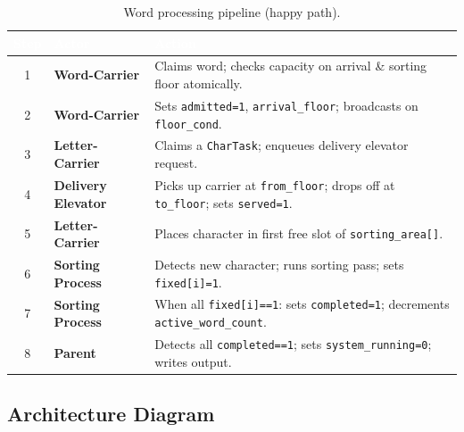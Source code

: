 \documentclass[12pt,a4paper]{article}
\newcommand{\code}[1]{\texttt{\small #1}}
\begin{document}
\begin{table}[h!]
\centering
\caption{Word processing pipeline (happy path).}
\begin{tabularx}{\textwidth}{c >{\bfseries}l X}
\toprule
\rowcolor{darkblue}
\textcolor{white}{Step} &
\textcolor{white}{Actor} &
\textcolor{white}{Action} \\
\midrule
1 & Word-Carrier & Claims word; checks capacity on arrival \& sorting floor atomically. \\
\rowcolor{rowgray}
2 & Word-Carrier & Sets \code{admitted=1}, \code{arrival\_floor}; broadcasts on \code{floor\_cond}. \\
3 & Letter-Carrier & Claims a \code{CharTask}; enqueues delivery elevator request. \\
\rowcolor{rowgray}
4 & Delivery Elevator & Picks up carrier at \code{from\_floor}; drops off at \code{to\_floor}; sets \code{served=1}. \\
5 & Letter-Carrier & Places character in first free slot of \code{sorting\_area[]}. \\
\rowcolor{rowgray}
6 & Sorting Process & Detects new character; runs sorting pass; sets \code{fixed[i]=1}. \\
7 & Sorting Process & When all \code{fixed[i]==1}: sets \code{completed=1}; decrements \code{active\_word\_count}. \\
\rowcolor{rowgray}
8 & Parent & Detects all \code{completed==1}; sets \code{system\_running=0}; writes output. \\
\bottomrule
\end{tabularx}
\end{table}

\subsection{Architecture Diagram}
\end{document}
